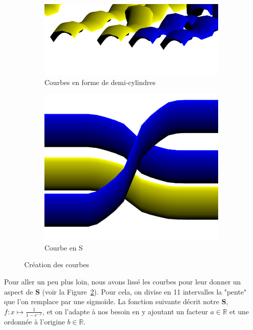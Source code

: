 \documentclass[a4paper,10.5pt]{report}
\begin{document}
    \begin{figure}[h!]
        \begin{subfigure}[t]{.6\textwidth}
            \includegraphics[width = .95\linewidth]{../cylindres.png}
            \caption{Courbes en forme de demi-cylindres}
        \end{subfigure}
        \begin{subfigure}[t]{.4\textwidth}
            \includegraphics[width = .95\linewidth]{../courbeS2D.png}
            \caption{Courbe en S}\label{S}
        \end{subfigure}
        \caption{Création des courbes}

    \end{figure}

    Pour aller un peu plus loin, nous avons lissé les courbes pour leur donner un aspect de \textbf{S} (voir la Figure~\ref{S}).
    Pour cela, on divise en 11 intervalles la "pente" que l'on remplace par une sigmoïde.
    La fonction suivante décrit notre \textbf{S}, $f: x \mapsto \frac{1}{1 - e^{-x}}$, et on l'adapte à nos besoin en y ajoutant un facteur $a\in\mathbb{R}$ et une ordonnée à l'origine $b\in\mathbb{R}$.
\end{document}

